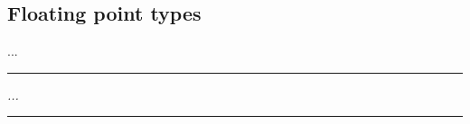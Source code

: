     \subsection{Floating point types}

        ...

    \par\noindent\rule{\textwidth}{0.4pt}
    \textit{...}
    \par\noindent\rule{\textwidth}{0.4pt}